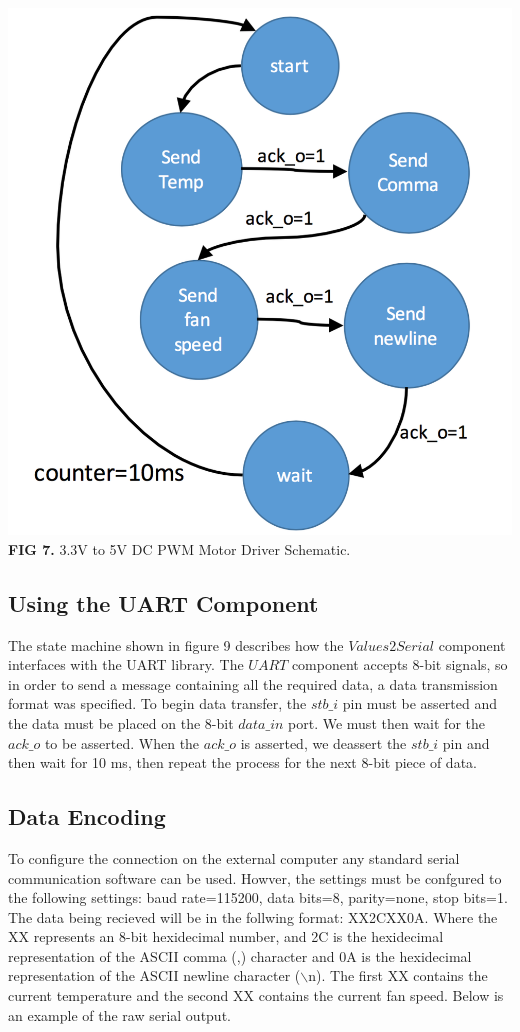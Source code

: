 \documentclass{article}
\begin{document}
\begin{center}
\includegraphics[scale=.35]{images/uartState}\\
\textbf{FIG 7.} 3.3V to 5V DC PWM Motor Driver Schematic.\\
\end{center}
\subsection{Using the UART Component}
The state machine shown in figure 9 describes how the $Values2Serial$ component interfaces with the UART library. The $UART$ component accepts 8-bit signals, so in order to send a message containing all the required data, a data transmission format was specified. To begin data transfer, the $stb\_i$ pin must be asserted and the data must be placed on the 8-bit $data\_in$ port. We must then wait for the $ack\_o$ to be asserted. When the $ack\_o$ is asserted, we deassert the $stb\_i$ pin and then wait for 10 ms, then repeat the process for the next 8-bit piece of data. 
\subsection{Data Encoding}
	To configure the connection on the external computer any standard serial communication software can be used. Howver, the settings must be confgured to the following settings: baud rate=115200, data bits=8, parity=none, stop bits=1. The data being recieved will be in the follwing format: XX2CXX0A. Where the XX represents an 8-bit hexidecimal number, and 2C is the hexidecimal representation of the ASCII comma (,) character and 0A is the hexidecimal representation of the ASCII newline character ($\backslash$n). The first XX contains the current temperature and the second XX contains the current fan speed. Below is an example of the raw serial output. 
\end{document}
